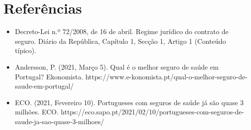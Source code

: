 \documentclass{report}
\begin{document}
\chapter{Referências}

\begin{itemize}
  \item Decreto-Lei n.º 72/2008, de 16 de abril. Regime jurídico do contrato de seguro. Diário da República, Capítulo 1, Secção 1, Artigo 1 (Conteúdo típico).
  \item Andersson, P. (2021, Março 5). Qual é o melhor seguro de saúde em Portugal? Ekonomista. https://www.e-konomista.pt/qual-o-melhor-seguro-de-saude-em-portugal/
  \item ECO. (2021, Fevereiro 10). Portugueses com seguros de saúde já são quase 3 milhões. ECO. https://eco.sapo.pt/2021/02/10/portugueses-com-seguros-de-saude-ja-sao-quase-3-milhoes/
\end{itemize}
\end{document}
